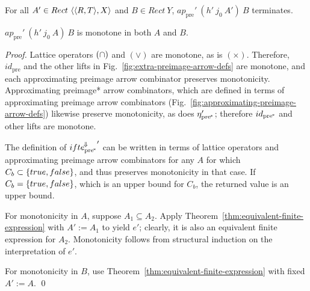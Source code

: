 \documentclass{llncs}
\newcommand{\figref}[1]{Fig.~\ref{#1}}
\newcommand{\join}{\vee}
\newcommand{\conv}{^{\mspace{-2mu}\Downarrow\mspace{-2mu}}}
\newcommand{\arrowconvif}{\ensuremath{ifte\conv}}
\newcommand{\arrowtrans}{\ensuremath{\eta}}
\newcommand{\pre}{_\mathrm{pre}}
\newcommand{\ppre}{_\mathrm{pre^{\mspace{-2mu}*}}}
\newcommand{\convifppre}{\arrowconvif\ppre}
\begin{document}
\begin{corollary}[termination]
For all $A' \in Rect~\langle{\langle{R,T}\rangle,X}\rangle$ and $B \in Rect~Y$, $ap\pre'~(h'~j_0~A')~B$ terminates.
\end{corollary}

\begin{theorem}[monotonicity]
\label{thm:monotonicity}
$ap\pre'~(h'~j_0~A)~B$ is monotone in both $A$ and $B$.%
\end{theorem}
\begin{proof}
Lattice operators $(\cap)$ and $(\join)$ are monotone, as is $(\times)$.
Therefore, $id\pre$ and the other lifts in \figref{fig:extra-preimage-arrow-defs} are monotone, and each approximating preimage arrow combinator preserves monotonicity.
Approximating preimage* arrow combinators, which are defined in terms of approximating preimage arrow combinators (\figref{fig:approximating-preimage-arrow-defs}) likewise preserve monotonicity, as does $\arrowtrans\ppre'$; therefore $id\ppre$ and other lifts are monotone.

The definition of ${\convifppre}'$ can be written in terms of lattice operators and approximating preimage arrow combinators for any $A$ for which $C_b \subset \{{true,false}\}$, and thus preserves monotonicity in that case.
If $C_b = \{{true,false}\}$, which is an upper bound for $C_b$, the returned value is an upper bound.

For monotonicity in $A$, suppose $A_1 \subseteq A_2$.
Apply Theorem~\ref{thm:equivalent-finite-expression} with $A' := A_1$ to yield $\mathit{e'}$; clearly, it is also an equivalent finite expression for $A_2$.
Monotonicity follows from structural induction on the interpretation of $\mathit{e'}$.

For monotonicity in $B$, use Theorem~\ref{thm:equivalent-finite-expression} with fixed $A' := A$.
\qed
\end{proof}
\end{document}
